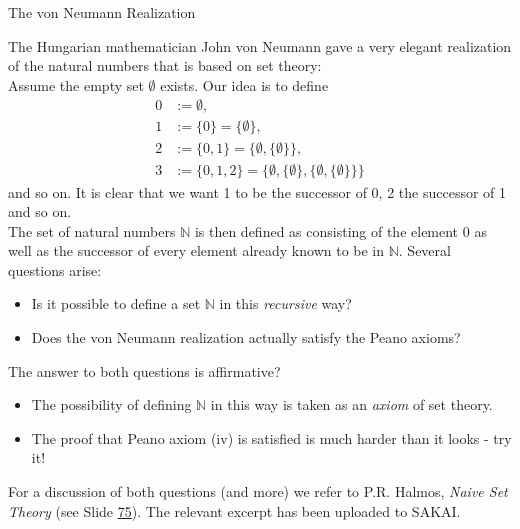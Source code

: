 \documentclass[smaller,hyperref={CJKbookmarks=true}]{beamer}
\newcommand{\N}{\mathbb{N}} \newcommand{\Z}{\mathbb{Z}} \newcommand{\Q}{\mathbb{Q}}
\begin{document}
\begin{frame}{The von Neumann Realization}
\begin{spacing}{1.1}
\vspace*{9pt}
The Hungarian mathematician John von Neumann gave a very elegant
realization of the natural numbers that is based on set theory:\\[6pt]
Assume the empty set $\emptyset$ exists. Our idea is to define
\begin{align*}
  0 &:=\emptyset,  \\
  1 &:=\{0\}=\{\emptyset\},  \\
  2 &:=\{0,1\}=\{\emptyset,\{\emptyset\}\},  \\
  3 &:=\{0,1,2\}=\{\emptyset,\{\emptyset\},\{\emptyset,\{\emptyset\}\}\}
\end{align*}
and so on. It is clear that we want 1 to be the successor of 0, 2 the successor of 1 and so on.\\[5pt]
The set of natural numbers $\N$ is then defined as consisting of the element 0 as well as the successor of every element already known to be in $\N$.
\newpage
\vspace*{9pt}
Several questions arise:
\begin{itemize}
  \item Is it possible to define a set $\N$ in this \emph{recursive} way?
  \item Does the von Neumann realization actually satisfy the Peano axioms?
\end{itemize}
The answer to both questions is af{}firmative?
\begin{itemize}
  \item The possibility of defining $\N$ in this way is taken as an \emph{axiom} of set theory.
  \item The proof that Peano axiom (iv) is satisfied is much harder than it looks - try it!
\end{itemize}
For a discussion of both questions (and more) we refer to P.R. Halmos, \emph{Naive Set Theory} (see Slide \hyperlink{Russel Antinomy}{75}). The relevant excerpt has been uploaded to SAKAI.
\end{spacing}
\end{frame}
\end{document}
